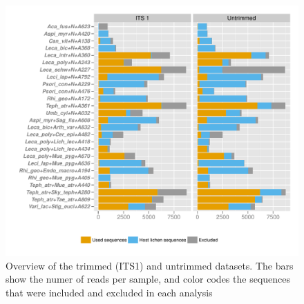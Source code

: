 \documentclass[a4paper, 11]{article}\usepackage[]{graphicx}\usepackage[]{color}
\makeatletter
\def\maxwidth{ %
  \ifdim\Gin@nat@width>\linewidth
    \linewidth
  \else
    \Gin@nat@width
  \fi
}
\newenvironment{knitrout}{}{} %
\makeatother
\begin{document}
%
%
\begin{knitrout}
\color{fgcolor}\begin{figure}[H]
\includegraphics[width=\maxwidth]{figure/3_Introitsx-1} \caption[Overview of the trimmed (ITS1) and untrimmed datasets]{Overview of the trimmed (ITS1) and untrimmed datasets. The bars show the numer of reads per sample, and color codes the sequences that were included and excluded in each analysis}\label{fig:3_Introitsx}
\end{figure}


\end{knitrout}
\end{document}
